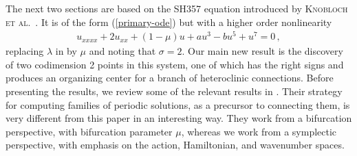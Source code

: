 \documentclass[10pt]{article}
\begin{document}
The next two sections are based on the SH357 equation introduced by \textsc{Knobloch et al.}~{\cite{kuw19}}. It is of the form (\ref{primary-ode}) but with a higher order nonlinearity
%
\begin{align}\label{e:SH357}
   u_{xxxx} + 2u_{xx} + (1-\mu)u + au^3 - bu^5 + u^7=0\,,
   \end{align}
%
replacing $\lambda$ in \cite{kuw19} by $\mu$ and noting that $\sigma=2$.
Our main new result is the discovery of two codimension 2 points in this system, one of which has the right signs and produces an organizing center for a branch of heteroclinic connections.  Before presenting the
results, we review some of the relevant results in \cite{kuw19}. Their strategy for computing families of periodic solutions, as a precursor to connecting them, is very different from this paper in an interesting way.  They work from a bifurcation perspective, with bifurcation parameter $\mu$, whereas we work from a symplectic perspective, with emphasis on the action, Hamiltonian, and wavenumber spaces.
\end{document}
